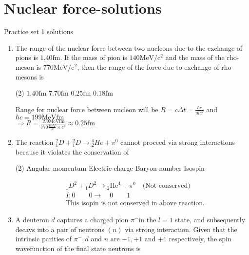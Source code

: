 \chapter{Nuclear force-solutions}
\begin{abox}
	Practice set 1 solutions
	\end{abox}
\begin{enumerate}
	\item The range of the nuclear force between two nucleons due to the exchange of pions is $1.40 \mathrm{fm}$. If the mass of pion is $140 \mathrm{MeV} / \mathrm{c}^{2}$ and the mass of the rho-meson is $770 \mathrm{MeV} / \mathrm{c}^{2}$, then the range of the force due to exchange of rho-mesons is
	{}
	\begin{tasks}(2)
		\task[\textbf{A.}] $1.40 \mathrm{fm}$
		\task[\textbf{B.}]$7.70 \mathrm{fm}$
		\task[\textbf{C.}]$0.25 \mathrm{fm}$
		\task[\textbf{D.}]$0.18 \mathrm{fm}$
	\end{tasks}
\begin{answer}
	Range for nuclear force between nucleon will be $R=c \Delta t=\frac{\hbar c}{m c^{2}}$ and $\hbar c=199 \mathrm{MeVfm}$\\
	$\Rightarrow R=\frac{199 \mathrm{MeVfm}}{770 \frac{\mathrm{MeV}}{c^{2}} \times c^{2}} \approx 0.25 \mathrm{fm}$
\end{answer}
	\item  The reaction ${ }_1^2 D+{ }_1^2 D \rightarrow{ }_2^4 H e+\pi^0$ cannot proceed via strong interactions because it violates the conservation of
	{}
	\begin{tasks}(2)
		\task[\textbf{a.}]Angular momentum
		\task[\textbf{b.}]Electric charge
		\task[\textbf{c.}]Baryon number
		\task[\textbf{d.}]Isospin 
	\end{tasks}
	\begin{answer}
		\begin{align*}
		&{ }_1 D^2+{ }_1 D^2 \rightarrow{ }_2 \mathrm{He}^4+\pi^0\quad
		\text{(Not conserved)}\\
		&I: 0 \qquad 0 \rightarrow\quad 0 \qquad 1\\
		&\text{This isopin is not conserved in above reaction.}
		\end{align*}
	\end{answer}
	\item  A deuteron $d$ captures a charged pion $\pi^{-}$in the $l=1$ state, and subsequently decays into a pair of neutrons $(n)$ via strong interaction. Given that the intrinsic parities of $\pi^{-}, d$ and $n$ are $-1,+1$ and $+1$ respectively, the spin wavefunction of the final state neutrons is

\end{enumerate}
